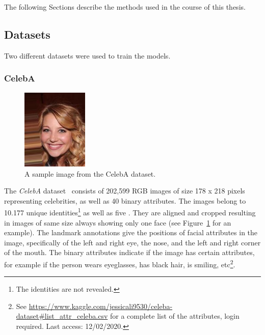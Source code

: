 The following Sections describe the methods used in the course of this thesis.

\subsection{Datasets}\label{subsec:datasets}

Two different datasets were used to train the models.

\subsubsection{CelebA}

\begin{figure}
    \begin{center}
        \includegraphics[width=0.28\textwidth]{images/celeba_sample_63.jpg}
    \end{center}
    \caption[CelebA dataset sample image]{A sample image from the CelebA dataset.}
    \label{fig:celeba_sample}
\end{figure}

The \textit{CelebA} dataset~\citep{liu2015faceattributes} consists of 202,599 RGB images of size 178 x 218 pixels representing celebrities, as well as 40 binary attributes.
The images belong to 10.177 unique identities\footnote{The identities are not revealed.} as well as five .
They are aligned and cropped resulting in images of same size always showing only one face (see Figure~\ref{fig:celeba_sample} for an example).
The landmark annotations give the positions of facial attributes in the image, specifically of the left and right eye, the nose, and the left and right corner of the mouth.
The binary attributes indicate if the image has certain attributes, for example if the person wears eyeglasses, has black hair, is smiling, etc\footnote{See \href{https://www.kaggle.com/jessicali9530/celeba-dataset\#list\_attr\_celeba.csv}{https://www.kaggle.com/jessicali9530/celeba-dataset\#list\_attr\_celeba.csv} for a complete list of the attributes, login required. Last access: 12/02/2020.}.

